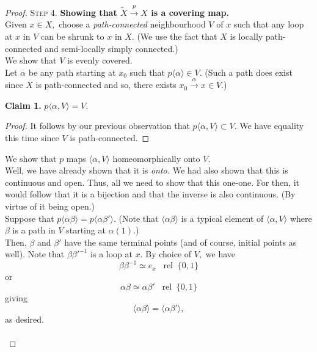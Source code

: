 \documentclass[12pt]{article}
\theoremstyle{definition}
\numberwithin{thm}{section}
\newcommand{\rel}{\;\;\operatorname{rel}\;}
\newenvironment{blockquote}
{\begin{mdframed}[skipabove=0pt, skipbelow=0pt, innertopmargin=4pt, innerbottommargin=4pt, bottomline=false,topline=false,rightline=false, linewidth=2pt]}
{\end{mdframed}}
\begin{document}
\begin{proof}
\textsc{Step 4.} \textbf{Showing that $\tilde{X} \overset{p}{\longrightarrow} X$ is a covering map.}\\
Given $x \in X,$ choose a \emph{path-connected} neighbourhood $V$ of $x$ such that any loop at $x$ in $V$ can be shrunk to $x$ in $X.$ (We use the fact that $X$ is locally path-connected and semi-locally simply connected.) \\
We show that $V$ is evenly covered. \\
Let $\alpha$ be any path starting at $x_0$ such that $p\langle \alpha\rangle \in V.$ (Such a path does exist since $X$ is path-connected and so, there exists $x_0\overset{\alpha}{\longrightarrow} x \in V.$) \\
\begin{blockquote}
	\textbf{Claim 1.} $p\langle \alpha, V\rangle = V.$
	\begin{proof} 
		It follows by our previous observation that $p\langle \alpha, V\rangle \subset V.$ We have equality this time since $V$ is path-connected.
	\end{proof}
\end{blockquote}
We show that $p$ maps $\langle \alpha, V\rangle$ homeomorphically onto $V.$\\
Well, we have already shown that it is \emph{onto.} We had also shown that this is continuous and open. Thus, all we need to show that this one-one. For then, it would follow that it is a bijection and that the inverse is also continuous. (By virtue of it being open.)\\
Suppose that $p\langle \alpha\beta\rangle = p\langle \alpha\beta'\rangle.$ (Note that $\langle \alpha\beta\rangle$ is a typical element of $\langle \alpha, V\rangle$ where $\beta$ is a path in $V$ starting at $\alpha(1)$.)\\
Then, $\beta$ and $\beta'$ have the same terminal points (and of course, initial points as well). Note that $\beta\beta'^{-1}$ is a loop at $x.$ By choice of $V,$ we have
\begin{equation*} 
	\beta\beta^{-1} \simeq e_x \rel\{0, 1\}
\end{equation*}
or
\begin{equation*} 
	\alpha\beta \simeq \alpha\beta' \rel\{0, 1\}
\end{equation*}
giving
\begin{equation*} 
	\langle \alpha\beta\rangle = \langle \alpha\beta'\rangle,
\end{equation*}
as desired.\\~\\

\end{proof}
\end{document}
